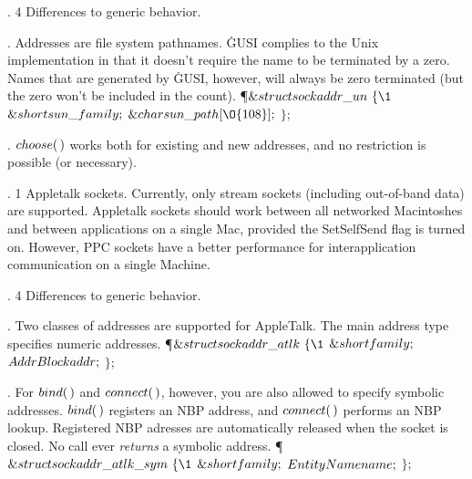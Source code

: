 . 4 Differences to generic behavior.

\fi

. Addresses are file system pathnames. \.{GUSI} complies to the
Unix implementation in that it doesn't require the name to be terminated by a
zero.
Names that are generated by \.{GUSI}, however, will always be zero terminated
(but
the zero won't be included in the count).
\Y\P $\&{struct}\ \\{sockaddr\_un}\ \{\1$\6
$\&{short}\ \\{sun\_family};$\5
\6
$\&{char}\ \\{sun\_path}[\O{108}];$\5
\2\6
$\};$\par
\fi

. \CD{}$\\{choose}(\,)$\DC{} works both for existing and new addresses, and
no restriction
is possible (or necessary).

\fi

. 1 Appletalk sockets. Currently, only stream sockets (including
out-of-band data)
are supported. Appletalk sockets should work between all networked Macintoshes
and between applications on a single Mac, provided the SetSelfSend flag is
turned
on. However, PPC sockets have a better performance for interapplication
communication
on a single Machine.

\fi

. 4 Differences to generic behavior.

\fi

. Two classes of addresses are supported for AppleTalk. The main address
type
specifies numeric addresses.
\Y\P $\&{struct}\ \\{sockaddr\_atlk}\ \{\1$\6
$\&{short}\ \\{family};$\5
\6
$\\{AddrBlock}\ \\{addr};$\5
\2\6
$\};$\par
\fi

. For \CD{}$\\{bind}(\,)$\DC{} and \CD{}$\\{connect}(\,)$\DC{}, however,
you are also allowed to specify symbolic
addresses. \CD{}$\\{bind}(\,)$\DC{} registers an NBP address, and \CD{}$%
\\{connect}(\,)$\DC{} performs an NBP
lookup. Registered NBP adresses are automatically released when the socket is
closed. No call ever {\it returns} a symbolic address.
\Y\P $\&{struct}\ \\{sockaddr\_atlk\_sym}\ \{\1$\6
$\&{short}\ \\{family};$\5
\6
$\\{EntityName}\ \\{name};$\5
\2\6
$\};$\par
\fi

